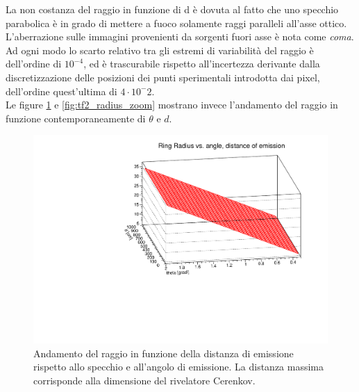 \documentclass[8pt]{extarticle}
\begin{document}
La non costanza del raggio in funzione di d è dovuta al fatto che uno specchio parabolica è in grado di mettere a fuoco solamente raggi paralleli all'asse ottico. L'aberrazione sulle immagini provenienti da sorgenti fuori asse è nota come \textit{coma}.
Ad ogni modo lo scarto relativo tra gli estremi di variabilità del raggio è dell'ordine di $10^{-4}$, ed è trascurabile rispetto all'incertezza derivante dalla discretizzazione delle posizioni dei punti sperimentali introdotta dai pixel, dell'ordine quest'ultima di $4\cdot 10^-2$.\\
Le figure \ref{fig:tf2_radius} e \ref{fig:tf2_radius_zoom} mostrano invece l'andamento del raggio in funzione contemporaneamente di $\theta$ e $d$. 
\begin{figure}
\begin{center}
\includegraphics[scale=0.4]{tf2_radius}
\caption{Andamento del raggio in funzione della distanza di emissione rispetto allo specchio e all'angolo di emissione. La distanza massima corrisponde alla dimensione del rivelatore Cerenkov.}
\label{fig:tf2_radius}
\end{center}
\end{figure}
\end{document}
